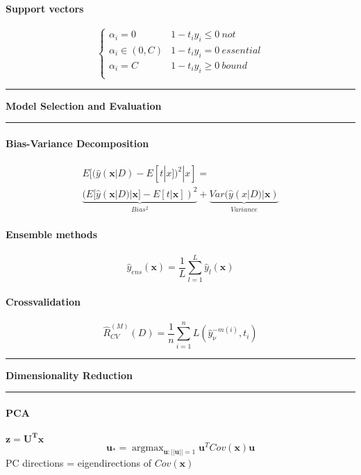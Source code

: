 \documentclass[7pt]{scrartcl}
\newlength{\secskip}
\renewcommand{\section}[1]{
  \vspace{\secskip}
  \hrule\vspace{.3em}
  \textbf{#1}
  \vspace{.3em}
  \hrule
  \vspace{\secskip}
}
\DeclareMathOperator*{\argmax}{argmax}
\renewcommand{\vec}{\mathbf}
\begin{document}
\begin{multicols}{4}
\paragraph{Support vectors}
\begin{equation*}
\left\lbrace
\begin{array}{ll}
\alpha_i = 0 & 1-t_iy_i \leq 0 ~not \\
\alpha_i \in (0,C) & 1-t_iy_i = 0 ~essential\\
\alpha_i = C & 1-t_iy_i \geq 0 ~bound\\
\end{array}
\right.
\end{equation*}

\section{Model Selection and Evaluation}
\paragraph{Bias-Variance Decomposition}
\begin{align*}
E[(\hat{y}(\vec{x}|D) - E[t|x])^2|x] = \\ \underbrace{(E[\hat{y}(\vec{x}|D)|\vec{x}] - E[t|\vec{x}])^2}_{Bias^2} + \underbrace{Var(\hat{y}(x|D) | \vec{x})}_{Variance}
\end{align*}
\paragraph{Ensemble methods}
\[\hat{y}_{ens}(\vec{x}) = \frac{1}{L} \sum_{l=1}^L \hat{y}_l(\vec{x})\]
\paragraph{Crossvalidation}
\[\hat{R}_{CV}^{(M)}(D) = \frac{1}{n}\sum_{i=1}^n L(\hat{y}_\nu^{-m(i)},t_i)\]

\section{Dimensionality Reduction}
\paragraph{PCA}
$\vec{z = U^T x}$
\[\vec{u}_* = \argmax_{\vec{u}:||\vec{u}||=1} \vec{u}^T Cov(\vec{x}) \vec{u}\]
PC directions = eigendirections of $Cov(\vec{x})$

\end{multicols}
\end{document}

